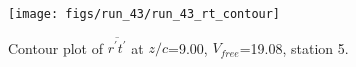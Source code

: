 \begin{figure}[H]
\centering
\texttt{[image: figs/run\_43/run\_43\_rt\_contour]}
\caption{Contour plot of $\overline{r^\prime t^\prime}$ at $z/c$=9.00, $V_{free}$=19.08, station 5.}
\label{fig:run_43_rt_contour}
\end{figure}


